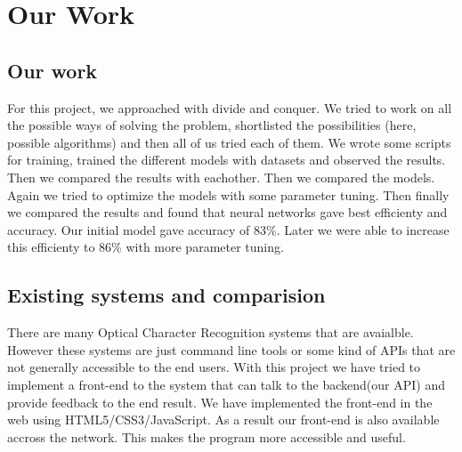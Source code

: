 \chapter{Our Work}

\section{Our work}
For this project, we approached with divide and conquer. We tried to work on all the possible ways of solving the problem, shortlisted the possibilities (here, possible algorithms) and then all of us tried each of them. We wrote some scripts for training, trained the different models with datasets and observed the results. Then we compared the results with eachother. Then we compared the models. Again we tried to optimize the models with some parameter tuning. Then finally we compared the results and found that neural networks gave best efficienty and accuracy. Our initial model gave accuracy of 83\%. Later we were able to increase this efficienty to 86\% with more parameter tuning.

\section{Existing systems and comparision}
There are many Optical Character Recognition systems that are avaialble. However these systems are just command line tools or some kind of APIs that are not generally accessible to the end users. With this project we have tried to implement a front-end to the system that can talk to the backend(our API) and provide feedback to the end result. We have implemented the front-end in the web using HTML5/CSS3/JavaScript. As a result our front-end is also available accross the network. This makes the program more accessible and useful.

